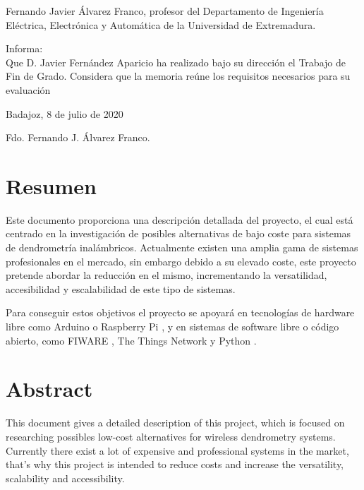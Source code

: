 \documentclass[11pt,a4paper,dvipsnames,twoside]{article}
\begin{document}
\newpage\thispagestyle{empty}
\vspace*{\fill}
Fernando Javier Álvarez Franco, profesor del Departamento de Ingeniería Eléctrica, Electrónica y Automática de la Universidad de Extremadura.

Informa:\\ Que D. Javier Fernández Aparicio ha realizado bajo su dirección el Trabajo de Fin de Grado. Considera que la memoria reúne los requisitos necesarios para su evaluación

\begin{center}
  Badajoz, 8 de julio de 2020
\end{center}
\vspace{2cm}
\begin{center}
  Fdo. Fernando J. Álvarez Franco.
\end{center}
\vspace*{\fill}
%

\newpage\thispagestyle{empty}
\vspace*{.5cm}

\newpage
\pagestyle{empty}\tableofcontents\clearpage\pagestyle{fancy} %

\newpage\thispagestyle{plain}\setcounter{page}{1}
\section*{Resumen}
Este documento proporciona una descripción detallada del proyecto, el cual está centrado en la investigación de posibles alternativas de bajo coste para sistemas de dendrometría inalámbricos. Actualmente existen una amplia gama de sistemas profesionales en el mercado, sin embargo debido a su elevado coste, este proyecto pretende abordar la reducción en el mismo, incrementando la versatilidad, accesibilidad y escalabilidad de este tipo de sistemas.

Para conseguir estos objetivos el proyecto se apoyará en tecnologías de hardware libre como Arduino \cite{Arduino} o Raspberry Pi \cite{Raspberrypi}, y en sistemas de software libre o código abierto, como FIWARE \cite{FIWARE}, The Things Network \cite{TTN} y Python \cite{Python}.

\section*{Abstract}
%
This document gives a detailed description of this project, which is focused on researching possibles low-cost alternatives for wireless dendrometry systems. Currently there exist a lot of expensive and professional systems in the market, that's why this project is intended to reduce costs and increase the versatility, scalability and accessibility.
\end{document}
